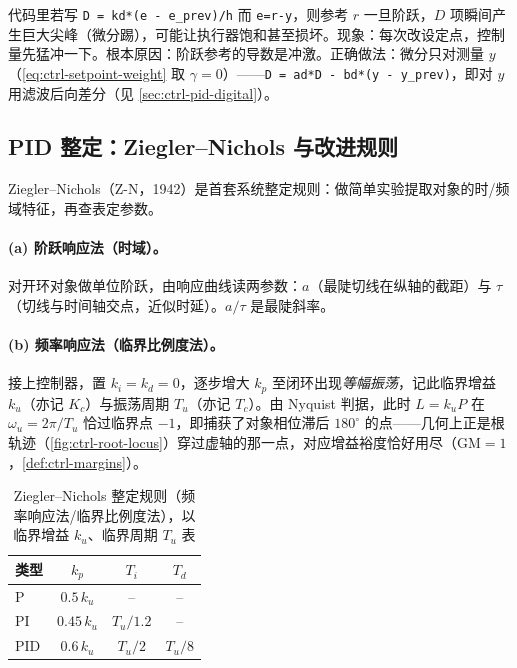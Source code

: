 \begin{pitfall}
代码里若写 \texttt{D = kd*(e - e\_prev)/\allowbreak h} 而 \texttt{e=r-y}，则参考 $r$ 一旦阶跃，$D$ 项瞬间产生巨大尖峰（微分踢），可能让执行器饱和甚至损坏。现象：每次改设定点，控制量先猛冲一下。根本原因：阶跃参考的导数是冲激。正确做法：微分只对测量 $y$（\cref{eq:ctrl-setpoint-weight} 取 $\gamma=0$）——\texttt{D = ad*D - bd*(y - y\_prev)}，即对 $y$ 用滤波后向差分（见 \cref{sec:ctrl-pid-digital}）。
\end{pitfall}

\subsection{PID 整定：Ziegler--Nichols 与改进规则}
\label{sec:ctrl-pid-tuning}

Ziegler--Nichols（Z-N，1942\cite{ziegler1942optimum}）是首套系统整定规则：做简单实验提取对象的时/频域特征，再查表定参数。

\paragraph{(a) 阶跃响应法（时域）。}
对开环对象做单位阶跃，由响应曲线读两参数：$a$（最陡切线在纵轴的截距）与 $\tau$（切线与时间轴交点，近似时延）。$a/\tau$ 是最陡斜率。

\paragraph{(b) 频率响应法（临界比例度法）。}
接上控制器，置 $k_i=k_d=0$，逐步增大 $k_p$ 至闭环出现\emph{等幅振荡}，记此临界增益 $k_u$（亦记 $K_c$）与振荡周期 $T_u$（亦记 $T_c$）。由 Nyquist 判据，此时 $L=k_uP$ 在 $\omega_u=2\pi/T_u$ 恰过临界点 $-1$，即捕获了对象相位滞后 $180^\circ$ 的点——几何上正是根轨迹（\cref{fig:ctrl-root-locus}）穿过虚轴的那一点，对应增益裕度恰好用尽（$\mathrm{GM}=1$，\cref{def:ctrl-margins}）。

\begin{table}[H]\centering\small
\caption{Ziegler--Nichols 整定规则（频率响应法/临界比例度法），以临界增益 $k_u$、临界周期 $T_u$ 表}
\label{tab:ctrl-zn-freq}
\begin{tabular}{lccc}
\toprule
类型 & $k_p$ & $T_i$ & $T_d$ \\
\midrule
P   & $0.5\,k_u$  & --        & --        \\
PI  & $0.45\,k_u$ & $T_u/1.2$ & --        \\
PID & $0.6\,k_u$  & $T_u/2$   & $T_u/8$   \\
\bottomrule
\end{tabular}
\end{table}

